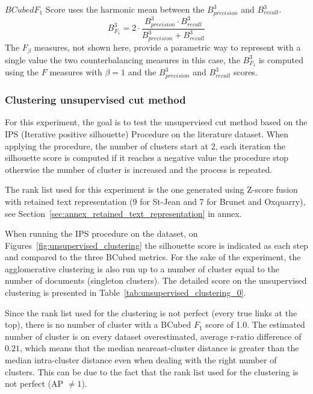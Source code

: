 \begin{definition}
  $BCubed F_1$ Score uses the harmonic mean between the $B^3_{precision}$ and $B^3_{recall}$.
  \begin{equation}
    B^3_{F_1} =
    2 \cdot \frac{B^3_{precision} \cdot B^3_{recall}}
    {B^3_{precision} + B^3_{recall}}
  \end{equation}
  The $F_\beta$ measures, not shown here, provide a parametric way to represent with a single value the two counterbalancing measures in this case, the $B^3_{F_1}$ is computed using the $F$ measures with $\beta = 1$ and the $B^3_{precision}$ and $B^3_{recall}$ scores.
\end{definition}

\subsubsection{Clustering unsupervised cut method}

For this experiment, the goal is to test the unsupervised cut method based on the IPS (Iterative positive silhouette) Procedure on the literature dataset.
When applying the procedure, the number of clusters start at 2, each iteration the silhouette score is computed if it reaches a negative value the procedure stop otherwise the number of cluster is increased and the process is repeated.

The rank list used for this experiment is the one generated using Z-score fusion with retained text representation (9 for St-Jean and 7 for Brunet and Oxquarry), see Section~\ref{sec:annex_retained_text_representation} in annex.

When running the IPS procedure on the dataset, on Figures~\ref{fig:unsupervised_clustering} the silhouette score is indicated as each step and compared to the three BCubed metrics.
For the sake of the experiment, the agglomerative clustering is also run up to a number of cluster equal to the number of documents (singleton clusters).
The detailed score on the unsupervised clustering is presented in Table~\ref{tab:unsupervised_clustering_0}.

Since the rank list used for the clustering is not perfect (every true links at the top), there is no number of cluster with a BCubed $F_1$ score of 1.0.
The estimated number of cluster is on every dataset overestimated, average r-ratio difference of $0.21$, which means that the median neareast-cluster distance is greater than the median intra-cluster distance even when dealing with the right number of clusters.
This can be due to the fact that the rank list used for the clustering is not perfect (AP $\neq 1$).

